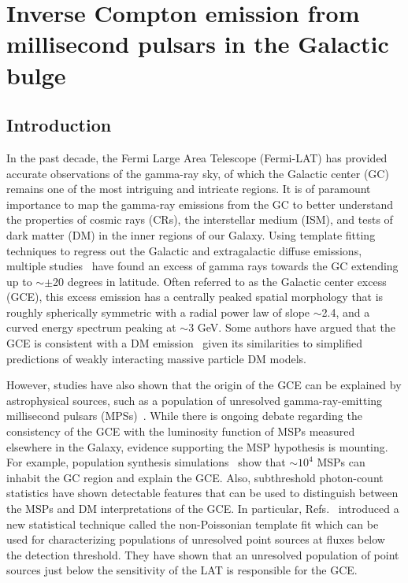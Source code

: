 \documentclass[doublespace,nopageskip]{VTthesis} %
\begin{document}
\chapter{Inverse Compton emission from millisecond pulsars in the Galactic bulge} \label{ch:IC_MSPs}

\section{Introduction}
In the past decade, the Fermi Large Area Telescope (Fermi-LAT) has provided accurate observations of the gamma-ray sky, of which the Galactic center (GC) remains one of the most intriguing and intricate regions. It is of paramount importance to map the gamma-ray emissions from the GC to better understand the properties of cosmic rays (CRs), the interstellar medium (ISM), and tests of dark matter (DM) in the inner regions of our Galaxy. Using template fitting techniques to regress out the Galactic and extragalactic diffuse emissions, multiple studies~\cite{Goodenough:2009gk,Vitale:2009hr,Hooper:2010mq,Abazajian:2012pn,Gordon:2013vta, Macias:2013vya,Hooper:2013rwa,Abazajian:2014fta,Daylan:2014rsa,Calore:2014xka,Zhou:2014lva,TheFermi-LAT:2015kwa,TheFermi-LAT:2017vmf} have found an excess of gamma rays towards the GC extending up to $\sim\pm$20 degrees in latitude. Often referred to as the Galactic center excess (GCE), this excess emission has a centrally peaked spatial morphology that is roughly spherically symmetric with a radial power law of slope $\sim$2.4, and a curved energy spectrum peaking at $\sim$3 GeV. Some authors have argued that the GCE is consistent with a DM emission~\cite{Goodenough:2009gk,Abazajian:2012pn,Gordon:2013vta,Macias:2013vya,Calore:2014xka,Daylan:2014rsa} given its similarities to simplified predictions of weakly interacting massive particle DM models.

However, studies have also shown that the origin of the GCE can be explained by astrophysical sources, such as a population of unresolved gamma-ray-emitting millisecond pulsars (MPSs)~\cite{Abazajian:2010zy,Abazajian:2012pn,Gordon:2013vta,Macias:2013vya,Calore:2014xka,Daylan:2014rsa}. While there is ongoing debate regarding the consistency of the GCE with the luminosity function of MSPs measured elsewhere in the Galaxy\cite{Cholis:2014lta, Hooper:2015jlu, Ploeg:2017vai, Bartels:2018xom}, evidence supporting the MSP hypothesis is mounting. For example, population synthesis simulations~\cite{Gonthier:2018ymi} show that $\sim$$10^4$ MSPs can inhabit the GC region and explain the GCE. Also, subthreshold photon-count statistics have shown detectable features that can be used to distinguish between the MSPs and DM interpretations of the GCE. In particular, Refs.~\cite{Lee:2015fea,Mishra-Sharma:2016gis} introduced a new statistical technique called the non-Poissonian template fit which can be used for characterizing populations of unresolved point sources at fluxes below the detection threshold. They have shown that an unresolved population of point sources just below the sensitivity of the LAT is responsible for the GCE.
\end{document}
